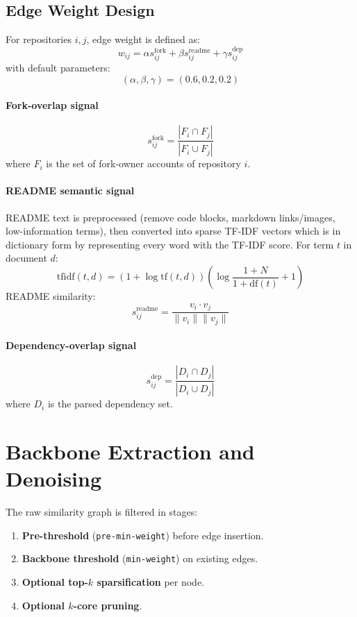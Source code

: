 \documentclass[11pt]{article}
\begin{document}
\subsection{Edge Weight Design}
For repositories $i,j$, edge weight is defined as:
\begin{equation}
w_{ij}=\alpha s^{\text{fork}}_{ij}+\beta s^{\text{readme}}_{ij}+\gamma s^{\text{dep}}_{ij}
\end{equation}
with default parameters:
\begin{equation}
(\alpha,\beta,\gamma)=(0.6,0.2,0.2)
\end{equation}

\paragraph{Fork-overlap signal}
\begin{equation}
s^{\text{fork}}_{ij}=\frac{|F_i\cap F_j|}{|F_i\cup F_j|}
\end{equation}
where $F_i$ is the set of fork-owner accounts of repository $i$.

\paragraph{README semantic signal}
README text is preprocessed (remove code blocks, markdown links/images, low-information terms), then converted into sparse TF-IDF vectors which is in dictionary form by representing every word with the TF-IDF score.
For term $t$ in document $d$:
\begin{equation}
\text{tfidf}(t,d)=\left(1+\log \text{tf}(t,d)\right)\left(\log\frac{1+N}{1+\text{df}(t)}+1\right)
\end{equation}
README similarity:
\begin{equation}
s^{\text{readme}}_{ij}=\frac{v_i\cdot v_j}{\|v_i\|\|v_j\|}
\end{equation}


\paragraph{Dependency-overlap signal}
\begin{equation}
s^{\text{dep}}_{ij}=\frac{|D_i\cap D_j|}{|D_i\cup D_j|}
\end{equation}
where $D_i$ is the parsed dependency set.

\section{Backbone Extraction and Denoising}
The raw similarity graph is filtered in stages:
\begin{enumerate}[leftmargin=1.5em]
    \item \textbf{Pre-threshold} (\texttt{pre-min-weight}) before edge insertion.
    \item \textbf{Backbone threshold} (\texttt{min-weight}) on existing edges.
    \item \textbf{Optional top-$k$ sparsification} per node.
    \item \textbf{Optional $k$-core pruning}.
\end{enumerate}
\end{document}
